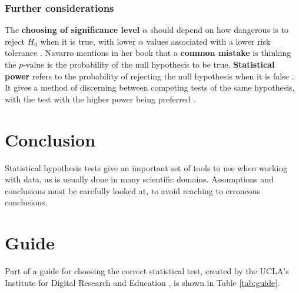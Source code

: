 \documentclass[letterpaper, 10 pt, conference]{article}
\begin{document}
\subsubsection{Further considerations}
The \textbf{choosing of significance level} $\alpha$ should depend on how dangerous is to reject $H_0$ when it is true, with lower $\alpha$ values associated with a lower risk tolerance \cite{spiegel}. Navarro mentions in her book \cite{Navarro} that a \textbf{common mistake} is thinking the $p$-value is the probability of the null hypothesis to be true. \textbf{Statistical power} refers to the probability of rejecting the null hypothesis when it is false \cite{Everitt_2002}. It gives a method of discerning between competing tests of the same hypothesis, with the test with the higher power being preferred \cite{Everitt_2002}. 

\section{Conclusion}
Statistical hypothesis tests give an important set of tools to use when working with data, as is usually done in many scientific domains. Assumptions and conclusions must be carefully looked at, to avoid reaching to erroneous conclusions. 

\appendix
\section{Guide} \label{appendix}
Part of a guide for choosing the correct statistical test, created by the UCLA's Institute for Digital Research and Education \cite{idre_stats}, is shown in Table \ref{tab:guide}.
\end{document}
